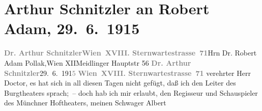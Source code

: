 

         
         \renewcommand{\erwaehntePersonen}{Personen: Robert Adam, Albert Steinrück, Hugo Thimig}
         \renewcommand{\erwaehnteInstitutionen}{Institutionen: Nationaltheater München}
         \renewcommand{\erwaehnteOrte}{Orte: Burgtheater, Meidlinger Hauptstraße, Sternwartestraße, Villa Annerl, Villa Zufriedenheit, Wien, XII., Meidling}
         \renewcommand{\erwaehnteWerke}{Werke: Der Fremde, Die Geschichte des Alî ibn Bekkâr mit Schams an-Nahâr, Fatme}
               \section[Arthur Schnitzler an Robert Adam, 29. 6. 1915]{ Arthur Schnitzler an Robert Adam, 29. 6. 1915}\nopagebreak{}\rehead{ }\begin{ledgroupsized}[t]{13cm}\normalsize\beginnumbering{} \toendnotes[C]{\smallbreak\pagebreak[2]} 
\toendnotes[C]{\smallbreak}\pstart{}{\pb}\textcolor{gray}{\textbf{Dr. Arthur Schnitzler}}\pend{}\pstart{}\textcolor{gray}{\textbf{Wien XVIII. Sternwartestrasse 71}}\pend{}{\bigskip}\pstart{}{\pb}Hrn Dr. Robert Adam Pollak,\pend{}\pstart{}Wien XII\pend{}\pstart{}Meidlinger Hauptstr 56\pend{}{\bigskip}\pstart
           \noindent{}{\pb}\textcolor{gray}{\textbf{Dr. Arthur Schnitzler}}\hfill 29. 6. 191\textcolor{gray}{5}\pend
           \pstart
           \textcolor{gray}{\textbf{Wien XVIII. Sternwartestrasse 71}}\pend
           \pstart
           verehrter Herr Doctor, es hat sich in all diesen Tagen nicht gefügt,
               daß ich den Leiter des Burgtheaters sprach; – doch hab ich mir erlaubt,
               den Regisseur und Schauspieler des Münchner
                  Hoftheaters, meinen Schwager Albert

\end{ledgroupsized}
